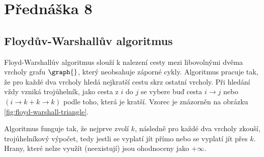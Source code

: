\section{Přednáška 8}

\subsection{Floydův-Warshallův algoritmus}

Floyd-Warshallův algoritmus slouží k nalezení cesty mezi libovolnými dvěma vrcholy grafu $\graph{}$, který neobsahuje záporné cykly.
Algoritmus pracuje tak, že pro každé dva vrcholy hledá nejkratší cestu skrz ostatní vrcholy.
Při hledání vždy vzniká trojúhelník, jako cesta z $i$ do $j$ se vybere buď cesta $i \rightarrow j$ nebo $(i \rightarrow k + k \rightarrow k)$ podle toho, která je kratší.
Vzorec je znázorněn na obrázku \ref{fig:floyd-warshall-triangle}.


Algoritmus funguje tak, že nejprve zvolí $k$, následně pro každé dva vrcholy zkouší, trojúhelníkový výpočet, tedy jestli se vyplatí jít přímo nebo se vyplatí jít přes $k$.
Hrany, které nelze využít (neexistují) jsou ohodnoceny jako $+\infty$.

